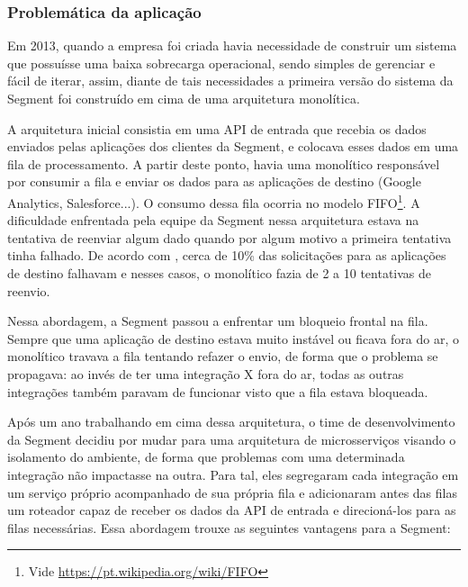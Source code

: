 \subsubsection{Problemática da aplicação}

Em 2013, quando a empresa foi criada havia necessidade de construir um sistema que possuísse uma
baixa sobrecarga operacional, sendo simples de gerenciar e fácil de iterar, assim, diante de tais
necessidades a primeira versão do sistema da Segment foi construído em cima de uma arquitetura monolítica.

A arquitetura inicial consistia em uma \gls{API} de entrada que recebia os dados enviados pelas aplicações dos
clientes da Segment, e colocava esses dados em uma fila de processamento. A partir deste ponto,
havia uma monolítico responsável por consumir a fila e enviar os dados para as aplicações de destino
(Google Analytics, Salesforce...). O consumo dessa fila ocorria no modelo \gls{FIFO}\footnote{Vide
\url{https://pt.wikipedia.org/wiki/FIFO}}. A dificuldade enfrentada pela equipe da Segment nessa
arquitetura estava na tentativa de reenviar algum dado quando por algum motivo a primeira tentativa
tinha falhado. De acordo com , cerca de 10\% das
solicitações para as aplicações de destino falhavam e nesses casos, o monolítico fazia de 2 a 10
tentativas de reenvio.

Nessa abordagem, a Segment passou a enfrentar um bloqueio frontal na fila. Sempre que uma aplicação
de destino estava muito instável ou ficava fora do ar, o monolítico travava a fila tentando refazer
o envio, de forma que o problema se propagava: ao invés de ter uma integração X fora do ar, todas as
outras integrações também paravam de funcionar visto que a fila estava bloqueada.

Após um ano trabalhando em cima dessa arquitetura, o time de desenvolvimento da Segment decidiu por
mudar para uma arquitetura de microsserviços visando o isolamento do ambiente, de forma que
problemas com uma determinada integração não impactasse na outra. Para tal, eles segregaram cada
integração em um serviço próprio acompanhado de sua própria fila e adicionaram antes das filas um
roteador capaz de receber os dados da \gls{API} de entrada e direcioná-los para as filas necessárias.
Essa abordagem trouxe as seguintes vantagens para a Segment:

